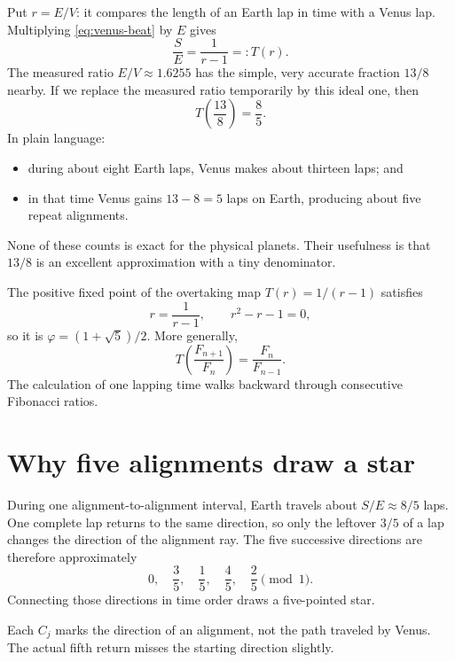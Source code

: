 Put $r=E/V$: it compares the length of an Earth lap in time with a Venus lap.
Multiplying \eqref{eq:venus-beat} by $E$ gives
\begin{equation}
  \frac SE=\frac1{r-1}=:T(r).                      \label{eq:venus-mobius}
\end{equation}
The measured ratio $E/V\approx1.6255$ has the simple, very accurate fraction
$13/8$ nearby.  If we replace the measured ratio temporarily by this ideal one,
then
\[
  T\!\left(\frac{13}{8}\right)=\frac85.
\]
In plain language:
\begin{itemize}
  \item during about eight Earth laps, Venus makes about thirteen laps; and
  \item in that time Venus gains $13-8=5$ laps on Earth, producing about five
  repeat alignments.
\end{itemize}
None of these counts is exact for the physical planets.  Their usefulness is
that $13/8$ is an excellent approximation with a tiny denominator.

\begin{checkpoint}[title={Why the golden ratio appears}]
The positive fixed point of the overtaking map $T(r)=1/(r-1)$ satisfies
\[
  r=\frac1{r-1},\qquad r^2-r-1=0,
\]
so it is $\varphi=(1+\sqrt5)/2$.  More generally,
\[
  T\!\left(\frac{F_{n+1}}{F_n}\right)
  =\frac{F_n}{F_{n-1}}.
\]
The calculation of one lapping time walks backward through consecutive
Fibonacci ratios.
\end{checkpoint}

\section{Why five alignments draw a star}

During one alignment-to-alignment interval, Earth travels about
$S/E\approx8/5$ laps.  One complete lap returns to the same direction, so only
the leftover $3/5$ of a lap changes the direction of the alignment ray.  The
five successive directions are therefore approximately
\[
  0,\quad \frac35,\quad \frac15,\quad \frac45,\quad \frac25
  \pmod 1.
\]
Connecting those directions in time order draws a five-pointed star.

\begin{center}

\small\color{muted}Each $C_j$ marks the direction of an alignment, not the
path traveled by Venus.  The actual fifth return misses the starting direction
slightly.
\end{center}

